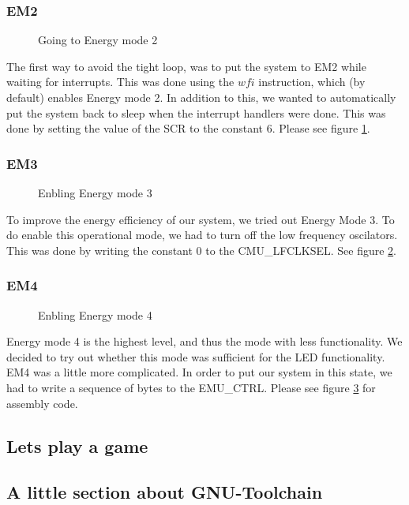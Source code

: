 	\subsubsection{EM2}
	
	\begin{figure}[h]
		
		\caption{Going to Energy mode 2}
		\label{code:wfi_scr}
	\end{figure}
	
	The first way to avoid the tight loop, was to put the system to EM2 while waiting for interrupts. This was done using the $wfi$ instruction, which (by default) enables Energy mode 2. In addition to this, we wanted to automatically put the system back to sleep when the interrupt handlers were done. This was done by setting the value of the SCR to the constant $6$. Please see figure \ref{code:wfi_scr}.

		\subsubsection{EM3}
		
		\begin{figure}[h]
			
			\caption{Enbling Energy mode 3}
			\label{code:em3}
		\end{figure}

		To improve the energy efficiency of our system, we tried out Energy Mode 3. To do enable this operational mode, we had to turn off the low frequency oscilators. This was done by writing the constant $0$ to the CMU\_LFCLKSEL. See figure \ref{code:em3}.
	
		\subsubsection{EM4}
	
		\begin{figure}[h]
			
			\caption{Enbling Energy mode 4}
			\label{code:em4}
		\end{figure}

		Energy mode 4 is the highest level, and thus the mode with less functionality. We decided to try out whether this mode was sufficient for the LED functionality. EM4 was a little more complicated. In order to put our system in this state, we had to write a sequence of bytes to the EMU\_CTRL. Please see figure \ref{code:em4} for assembly code.

	
	\subsection{Lets play a game}

	\subsection{A little section about GNU-Toolchain}
